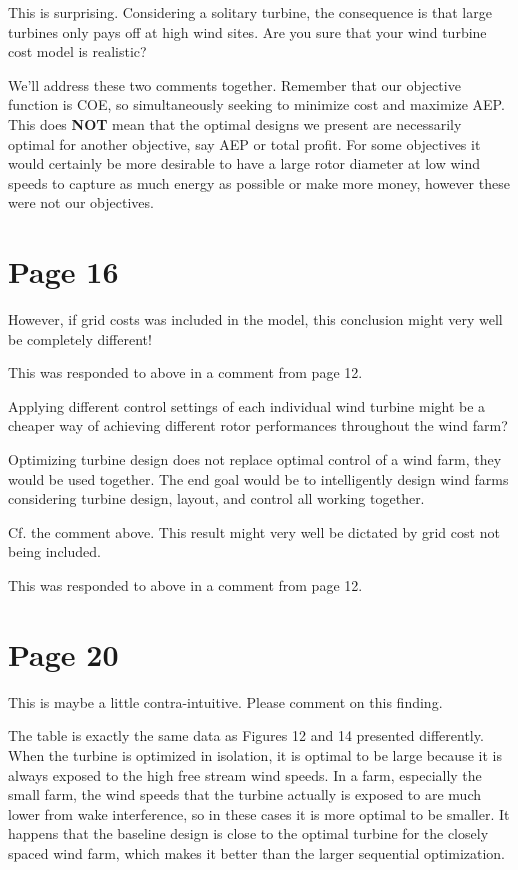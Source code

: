 \documentclass[12pt]{report}
\begin{document}
 This is surprising. Considering a solitary turbine, the consequence is that large turbines only pays off at high wind sites. Are you sure that your wind turbine cost model is realistic?
 
 \color{blue} We'll address these two comments together. Remember that our objective function is COE, so simultaneously seeking to minimize cost and maximize AEP. This does \textbf{NOT} mean that the optimal designs we present are necessarily optimal for another objective, say AEP or total profit. For some objectives it would certainly be more desirable to have a large rotor diameter at low wind speeds to capture as much energy as possible or make more money, however these were not our objectives. 
 
 \bigskip \color{black}
   \section*{Page 16}
   \bigskip \color{black}
   However, if grid costs was included in the model, this conclusion might very well be completely different!
   
    \color{blue} This was responded to above in a comment from page 12.
   
   \bigskip \color{black}
   Applying different control settings of each individual wind turbine might be a cheaper way of achieving different rotor performances throughout the wind farm?  
   
   \color{blue} Optimizing turbine design does not replace optimal control of a wind farm, they would be used together. The end goal would be to intelligently design wind farms considering turbine design, layout, and control all working together.
   
   \bigskip \color{black}
   Cf. the comment above. This result might very well be dictated by grid cost not being included.
   
    \color{blue} This was responded to above in a comment from page 12.
   
   \bigskip \color{black}
    \section*{Page 20}
    \bigskip \color{black}
   This is maybe a little contra-intuitive. Please comment on this finding.
   
    \color{blue} The table is exactly the same data as Figures 12 and 14 presented differently. When the turbine is optimized in isolation, it is optimal to be large because it is always exposed to the high free stream wind speeds. In a farm, especially the small farm, the wind speeds that the turbine actually is exposed to are much lower from wake interference, so in these cases it is more optimal to be smaller. It happens that the baseline design is close to the optimal turbine for the closely spaced wind farm, which makes it better than the larger sequential optimization. 
   
\end{document}
